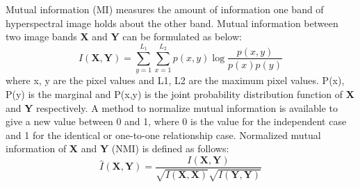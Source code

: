 \documentclass[document.tex]{subfiles}
\begin{document}
%

	Mutual information (MI) measures the amount of information one band of hyperspectral image holds about the other band\cite{20}. Mutual information between two image bands \textbf{X} and \textbf{Y} can be formulated as below:
\begin{equation}
I(\textbf{X},\textbf{Y}) = \sum_{y=1}^{L_1}\sum_{x=1}^{L_2}p(x,y)\log\dfrac{p(x,y)}{p(x)p(y)}
\end{equation}
where x, y are the pixel values and L1, L2 are the maximum
pixel values. P(x), P(y) is the marginal and P(x,y) is the joint probability distribution function of \textbf{X} and \textbf{Y} respectively\cite{20}. A method to normalize mutual information\cite{10} is
available to give a new value between 0 and 1, where 0 is the value for the independent case
and 1 for the identical or one-to-one relationship case\cite{9}. Normalized mutual information of \textbf{X} and \textbf{Y}
(NMI) is defined as follows:
\begin{equation}
\hat{I}(\textbf{X},\textbf{Y}) = \dfrac{I(\textbf{X}, \textbf{Y})}{\sqrt{I(\textbf{X},\textbf{X})}\sqrt{I( \textbf{Y}, \textbf{Y})}}
\end{equation}
\end{document}
